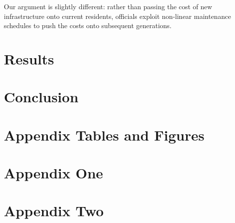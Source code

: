 \documentclass[12pt]{article}
\begin{document}
Our argument is slightly different: rather than passing the cost of new infrastructure onto current residents, officials exploit non-linear maintenance schedules to push the costs onto subsequent generations.



\section{Results \label{sec:results}}

% 



% 


% 


\section{Conclusion\label{sec:conclusion}}


\clearpage
\begin{singlespace}

%
%

\end{singlespace}


\newpage
\appendix
\setcounter{table}{0}
\renewcommand{\tablename}{Appendix Table}
\renewcommand{\figurename}{Appendix Figure}
\renewcommand{\thetable}{A\arabic{table}}
\setcounter{figure}{0}
\renewcommand{\thefigure}{A\arabic{figure}}

\section{Appendix Tables and Figures}
% 

\newpage 
\section{Appendix One \label{sec:appendix:first}}
\renewcommand{\thetable}{B\arabic{table}}
\setcounter{table}{0}
\renewcommand{\thefigure}{B\arabic{figure}}
\setcounter{figure}{0}

% 

\newpage
\section{Appendix Two
\label{sec:appendix:two}}
\renewcommand{\thetable}{C\arabic{table}}
\setcounter{table}{0}
\renewcommand{\thefigure}{C\arabic{figure}}
\setcounter{figure}{0}
\end{document}
